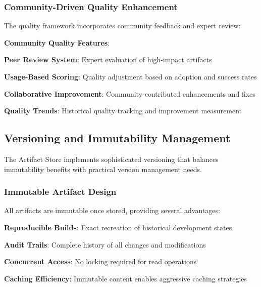 \subsubsection*{Community-Driven Quality Enhancement}

The quality framework incorporates community feedback and expert review:

\begin{successbox}
\textbf{Community Quality Features}:
\begin{compactlist}
    \item \textbf{Peer Review System}: Expert evaluation of high-impact artifacts
    \item \textbf{Usage-Based Scoring}: Quality adjustment based on adoption and success rates
    \item \textbf{Collaborative Improvement}: Community-contributed enhancements and fixes
    \item \textbf{Quality Trends}: Historical quality tracking and improvement measurement
\end{compactlist}
\end{successbox}

\subsection*{Versioning and Immutability Management}

The Artifact Store implements sophisticated versioning that balances immutability benefits with practical version management needs.

\subsubsection*{Immutable Artifact Design}

All artifacts are immutable once stored, providing several advantages:

\begin{expandedlist}
    \item \textbf{Reproducible Builds}: Exact recreation of historical development states
    \item \textbf{Audit Trails}: Complete history of all changes and modifications
    \item \textbf{Concurrent Access}: No locking required for read operations
    \item \textbf{Caching Efficiency}: Immutable content enables aggressive caching strategies
\end{expandedlist}

